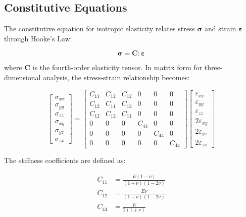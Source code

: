 \subsection{Constitutive Equations}

The constitutive equation for isotropic elasticity relates stress $\boldsymbol{\sigma}$ and strain $\boldsymbol{\varepsilon}$ through Hooke's Law:

\[
\boldsymbol{\sigma} = \mathbf{C} : \boldsymbol{\varepsilon}
\]

where $\mathbf{C}$ is the fourth-order elasticity tensor. In matrix form for three-dimensional analysis, the stress-strain relationship becomes:

\[
\begin{bmatrix}
\sigma_{xx} \\
\sigma_{yy} \\
\sigma_{zz} \\
\sigma_{xy} \\
\sigma_{yz} \\
\sigma_{zx}
\end{bmatrix}
=
\begin{bmatrix}
C_{11} & C_{12} & C_{12} & 0 & 0 & 0 \\
C_{12} & C_{11} & C_{12} & 0 & 0 & 0 \\
C_{12} & C_{12} & C_{11} & 0 & 0 & 0 \\
0      & 0      & 0      & C_{44} & 0 & 0 \\
0      & 0      & 0      & 0 & C_{44} & 0 \\
0      & 0      & 0      & 0 & 0 & C_{44}
\end{bmatrix}
\begin{bmatrix}
\varepsilon_{xx} \\
\varepsilon_{yy} \\
\varepsilon_{zz} \\
2\varepsilon_{xy} \\
2\varepsilon_{yz} \\
2\varepsilon_{zx}
\end{bmatrix}
\]

The stiffness coefficients are defined as:

\[
\begin{aligned}
C_{11} &= \frac{E(1 - \nu)}{(1 + \nu)(1 - 2\nu)} \\
C_{12} &= \frac{E\nu}{(1 + \nu)(1 - 2\nu)} \\
C_{44} &= \frac{E}{2(1 + \nu)}
\end{aligned}
\]

